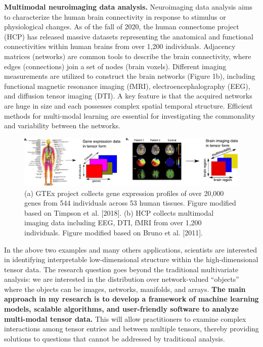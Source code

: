 \documentclass[10pt]{article}
\theoremstyle{definition}
\theoremstyle{definition}
\theoremstyle{definition}
\begin{document}
{\bf Multimodal neuroimaging data analysis.} Neuroimaging data analysis aims to characterize the human brain connectivity in response to stimulus or physiological changes. As of the fall of 2020, the human connectome project (HCP) has released massive datasets representing the anatomical and functional connectivities within human brains from over 1,200 individuals. Adjacency matrices (networks) are common tools to describe the brain connectivity, where edges (connections) join a set of nodes (brain voxels). Different imaging measurements are utilized to construct the brain networks (Figure 1b), including functional magnetic resonance imaging (fMRI), electroencephalography (EEG), and diffusion tensor imaging (DTI). A key feature is that the acquired networks are huge in size and each possesses complex spatial temporal structure. Efficient methods for multi-modal learning are essential for investigating the commonality and variability between the networks. 

\begin{figure}[H]
\begin{center}
\includegraphics[width=1\textwidth]{example.pdf}
\caption{\small (a) GTEx project collects gene expression profiles of over 20,000 genes from 544 individuals across 53 human tissues. Figure modified based on Timpson et al. [2018]. (b) HCP collects multimodal imaging data including EEG, DTI, fMRI from over 1,200 individuals. Figure modified based on Bruno et al. [2011].}
\end{center}
\end{figure} 

In the above two examples and many others applications, scientists are interested in identifying interpretable low-dimensional structure within the high-dimensional tensor data. The research question goes beyond the traditional multivariate analysis: we are interested in the distribution over network-valued ``objects'' where the objects can be images, networks, manifolds, and arrays. {\bf The main approach in my research is to develop a framework of machine learning models, scalable algorithms, and user-friendly software to analyze multi-modal tensor data.} This will allow practitioners to examine complex interactions among tensor entries and between multiple tensors, thereby providing solutions to questions that cannot be addressed by traditional analysis.  
\end{document}
